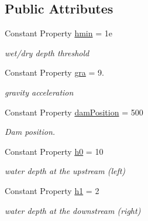 \subsection*{Public Attributes}
\begin{DoxyCompactItemize}
\item 
Constant Property \hyperlink{class_dam_break_wet_uniform_mesh2d_a3bbff33c4e6b0b79f2b6e1d56047a650}{hmin} = 1e
\begin{DoxyCompactList}\small\item\em wet/dry depth threshold \end{DoxyCompactList}\item 
Constant Property \hyperlink{class_dam_break_wet_uniform_mesh2d_a84a7e54c850fd637d1e6aebe40f98bc5}{gra} = 9.
\begin{DoxyCompactList}\small\item\em gravity acceleration \end{DoxyCompactList}\item 
Constant Property \hyperlink{class_dam_break_wet_uniform_mesh2d_af0472aa7b0c6f8ff16a119912c63b336}{dam\+Position} = 500
\begin{DoxyCompactList}\small\item\em Dam position. \end{DoxyCompactList}\item 
Constant Property \hyperlink{class_dam_break_wet_uniform_mesh2d_aa27baef54ce69e19832e6a75c3788fd0}{h0} = 10
\begin{DoxyCompactList}\small\item\em water depth at the upstream (left) \end{DoxyCompactList}\item 
Constant Property \hyperlink{class_dam_break_wet_uniform_mesh2d_a1923c8abd543f0d316f9ace43395c6e6}{h1} = 2
\begin{DoxyCompactList}\small\item\em water depth at the downstream (right) \end{DoxyCompactList}\end{DoxyCompactItemize}
